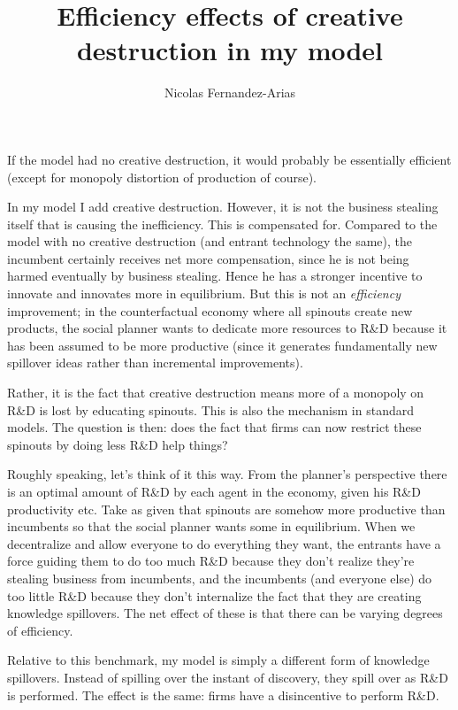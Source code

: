 \documentclass[12pt,english]{article}
\theoremstyle{remark}
\begin{document}
\title{Efficiency effects of creative destruction in my model}
\author{Nicolas Fernandez-Arias}
\maketitle

If the model had no creative destruction, it would probably be essentially efficient (except for monopoly distortion of production of course). 

In my model I add creative destruction. However, it is not the business stealing itself that is causing the inefficiency. This is compensated for. Compared to the model with no creative destruction (and entrant technology the same), the incumbent certainly receives net more compensation, since he is not being harmed eventually by business stealing. Hence he has a stronger incentive to innovate and innovates more in equilibrium. But this is not an \textit{efficiency} improvement; in the counterfactual economy where all spinouts create new products, the social planner wants to dedicate more resources to R\&D because it has been assumed to be more productive (since it generates fundamentally new spillover ideas rather than incremental improvements).

Rather, it is the fact that creative destruction means more of a monopoly on R\&D is lost by educating spinouts. This is also the mechanism in standard models. The question is then: does the fact that firms can now restrict these spinouts by doing less R\&D help things? 

Roughly speaking, let's think of it this way. From the planner's perspective there is an optimal amount of R\&D by each agent in the economy, given his R\&D productivity etc. Take as given that spinouts are somehow more productive than incumbents so that the social planner wants some in equilibrium. When we decentralize and allow everyone to do everything they want, the entrants have a force guiding them to do too much R\&D because they don't realize they're stealing business from incumbents, and the incumbents (and everyone else) do too little R\&D because they don't internalize the fact that they are creating knowledge spillovers. The net effect of these is that there can be varying degrees of efficiency. 

Relative to this benchmark, my model is simply a different form of knowledge spillovers. Instead of spilling over the instant of discovery, they spill over as R\&D is performed. The effect is the same: firms have a disincentive to perform R\&D. 
\end{document}
